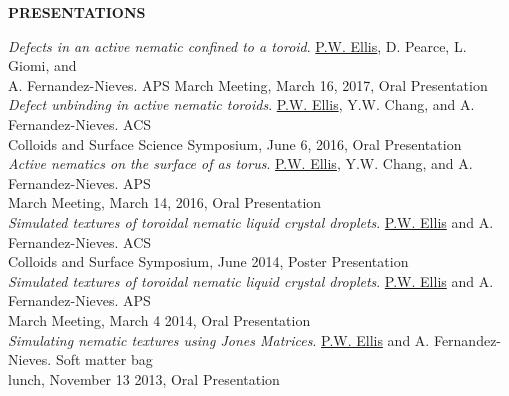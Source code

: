 \documentclass[10pt]{article}
\newenvironment{changemargin}[2]{%
  \list{}{\rightmargin#2\leftmargin#1
    \parsep=0pt\topsep=1pt\partopsep=0pt}
\item[]} {\endlist}
\newenvironment{indentmore}{\begin{changemargin}{10pt}{0cm}}{\end{changemargin}}
\begin{document}
\newpage
\textbf{\large PRESENTATIONS}
\begin{indentmore}
\emph{Defects in an active nematic confined to a toroid}. \underline{P.W. Ellis}, D. Pearce, L. Giomi, and \\ \hspace*{15pt} A. Fernandez-Nieves. APS March Meeting, March 16, 2017, Oral Presentation\\

\emph{Defect unbinding in active nematic toroids}. \underline{P.W. Ellis}, Y.W. Chang, and A. Fernandez-Nieves. ACS\\ \hspace*{15pt} Colloids and Surface Science Symposium, June 6, 2016, Oral Presentation\\

\emph{Active nematics on the surface of as torus}. \underline{P.W. Ellis}, Y.W. Chang, and A. Fernandez-Nieves. APS\\ \hspace*{15pt} March Meeting, March 14, 2016, Oral Presentation\\

\emph{Simulated textures of toroidal nematic liquid crystal droplets}. \underline{P.W. Ellis} and A. Fernandez-Nieves. ACS\\ \hspace*{15pt} Colloids and Surface Symposium, June 2014, Poster Presentation\\

\emph{Simulated textures of toroidal nematic liquid crystal droplets}. \underline{P.W. Ellis} and A. Fernandez-Nieves. APS\\ \hspace*{15pt} March Meeting, March 4 2014, Oral Presentation\\

\emph{Simulating nematic textures using Jones Matrices}. \underline{P.W. Ellis} and A. Fernandez-Nieves. Soft matter bag\\ \hspace*{15pt} lunch, November 13 2013, Oral Presentation\\
\end{indentmore}

%
%
%
%
\end{document}
